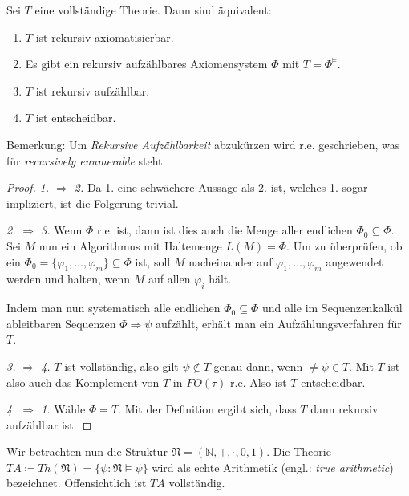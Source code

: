 \begin{satz}
	Sei $T$ eine vollständige Theorie. Dann sind äquivalent:
	\begin{enumerate}
		\item $T$ ist rekursiv axiomatisierbar.
		\item Es gibt ein rekursiv aufzählbares Axiomensystem $\Phi$ mit $T=\Phi^{\models}$.
		\item $T$ ist rekursiv aufzählbar.
		\item $T$ ist entscheidbar.
	\end{enumerate}
\end{satz}
Bemerkung: Um \textit{Rekursive Aufzählbarkeit} abzukürzen wird r.e. geschrieben, was für \textit{recursively enumerable} steht.
\begin{proof}
	\textit{1. $\Rightarrow$ 2.} Da 1. eine schwächere Aussage als 2. ist, welches 1. sogar impliziert, ist die Folgerung trivial.
	
	\textit{2. $\Rightarrow$ 3.} Wenn $\Phi$ r.e. ist, dann ist dies auch die Menge aller endlichen $\Phi_0\subseteq \Phi$. Sei $M$ nun ein Algorithmus mit Haltemenge $L(M)=\Phi$. Um zu überprüfen, ob ein $\Phi_0=\{\varphi_1,\dots,\varphi_m\}\subseteq \Phi$ ist, soll $M$ nacheinander auf $\varphi_1,\dots,\varphi_m$ angewendet werden und halten, wenn $M$ auf allen $\varphi_i$ hält.
	
	Indem man nun systematisch alle endlichen $\Phi_0\subseteq\Phi$ und alle im Sequenzenkalkül ableitbaren Sequenzen $\Phi\Rightarrow\psi$ aufzählt, erhält man ein Aufzählungsverfahren für $T$.
	
	\textit{3. $\Rightarrow$ 4.} $T$ ist vollständig, also gilt $\psi \notin T$ genau dann, wenn $\neq\psi\in T$. Mit $T$ ist also auch das Komplement von $T$ in $FO(\tau)$ r.e. Also ist $T$ entscheidbar.
	
	\textit{4. $\Rightarrow$ 1.} Wähle $\Phi=T$. Mit der Definition ergibt sich, dass $T$ dann rekursiv aufzählbar ist.
\end{proof}

Wir betrachten nun die Struktur $\mathfrak{N}=(\mathbb{N},+,\cdot,0,1)$. Die Theorie $TA\coloneqq Th(\mathfrak{N})=\{\psi : \mathfrak{N}\models\psi\}$ wird als echte Arithmetik (engl.: \textit{true arithmetic}) bezeichnet. Offensichtlich ist $TA$ vollständig.

